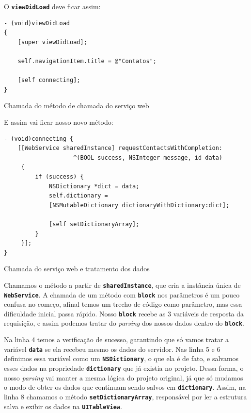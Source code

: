 \documentclass[a4paper,12pt,brazil,doubleside]{book}
\begin{document}
\begin{singlespace}
O \texttt{\textbf{viewDidLoad}} deve ficar assim:

\begin{listing}[H]
\begin{verbatim}
- (void)viewDidLoad
{
    [super viewDidLoad];

    self.navigationItem.title = @"Contatos";
    
    [self connecting];
}
\end{verbatim}
\caption{Chamada do método de chamada do serviço web}
\end{listing}


E assim vai ficar nosso novo método:

\begin{listing}[H]
\begin{verbatim}
- (void)connecting {
    [[WebService sharedInstance] requestContactsWithCompletion:
                    ^(BOOL success, NSInteger message, id data)
     {
         if (success) {
             NSDictionary *dict = data;
             self.dictionary = 
             [NSMutableDictionary dictionaryWithDictionary:dict];
             
             [self setDictionaryArray];
         }
     }];
}
\end{verbatim}
\caption{Chamada do serviço web e tratamento dos dados}
\end{listing}


Chamamos o método a partir de \texttt{\textbf{sharedInstance}}, que cria a instância única de\\ \texttt{\textbf{WebService}}. A chamada de um método com \texttt{\textbf{block}} nos parâmetros é um pouco confusa no começo, afinal temos um trecho de código como parâmetro, mas essa dificuldade inicial passa rápido. Nosso \texttt{\textbf{block}} recebe as 3 variáveis de resposta da requisição, e assim podemos tratar  do \emph{parsing} dos nossos dados dentro do \texttt{\textbf{block}}.

Na linha 4 temos a verificação de sucesso, garantindo que só vamos tratar a variável \texttt{\textbf{data}} se ela recebeu mesmo os dados do servidor. Nas linha 5 e 6 definimos essa variável como um \texttt{\textbf{NSDictionary}}, o que ela é de fato, e salvamos esses dados na propriedade \texttt{\textbf{dictionary}} que já existia no projeto. Dessa forma, o nosso \emph{parsing} vai manter a mesma lógica do projeto original, já que só mudamos o modo de obter os dados que continuam sendo salvos em \texttt{\textbf{dictionary}}. Assim, na linha 8 chamamos o método \texttt{\textbf{setDictionaryArray}}, responsável por ler a estrutura salva e exibir os dados na \texttt{\textbf{UITableView}}.


\end{singlespace}
\end{document}
